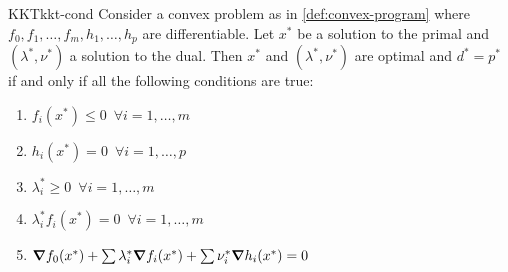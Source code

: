 \documentclass[12pt]{extarticle}
\begin{document}
\begin{theorem}{KKT}{kkt-cond}
	Consider a convex problem as in \cref{def:convex-program} where $f_0, f_1, \dots, f_m, h_1, \dots, h_p$
	are differentiable.
	Let $x^*$ be a solution to the primal and $(\lambda^*, \nu^*)$ a solution to the dual.
	Then $x^*$ and $(\lambda^*, \nu^*)$ are optimal and $d^* = p^*$ if and only if all the following
	conditions are true:
	\begin{enumerate}[label=(\roman*.)]
		\item $f_i(x^*) \leq 0 \enspace \forall i = 1, \dots, m$
		\item $h_i(x^*) = 0 \enspace \forall i = 1, \dots, p$
		\item $\lambda_i^* \geq 0 \enspace \forall i = 1, \dots, m$
		\item $\lambda^*_i f_i(x^*) = 0 \enspace \forall i = 1, \dots, m$
		\item $\grad f_0(x^*) + \sum \lambda_i^* \grad f_i(x^*) + \sum \nu_i^* \grad h_i(x^*) = 0$
	\end{enumerate}
\end{theorem}
\end{document}
